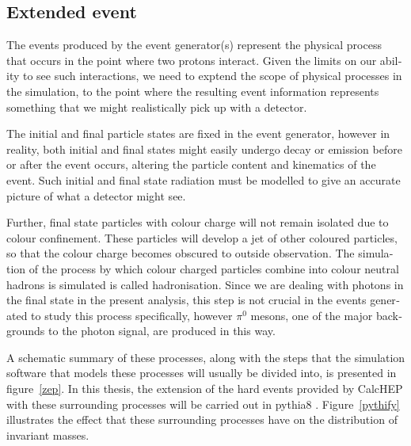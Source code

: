 \begin{english}
\section{Extended event}
The events produced by the event generator(s) represent the physical process that occurs in the point where two protons interact. Given the limits on our ability to see such interactions, we need to exptend the scope of physical processes in the simulation, to the point where the resulting event information represents something that we might realistically pick up with a detector.

The initial and final particle states are fixed in the event generator, however in reality, both initial and final states might easily undergo decay or emission before or after the event occurs, altering the particle content and kinematics of the event. Such initial and final state radiation must be modelled to give an accurate picture of what a detector might see.

Further, final state particles with colour charge will not remain isolated due to colour confinement. These particles will develop a jet of other coloured particles, so that the colour charge becomes obscured to outside observation. The simulation of the process by which colour charged particles combine into colour neutral hadrons is simulated is called hadronisation. Since we are dealing with photons in the final state in the present analysis, this step is not crucial in the events generated to study this process specifically, however $\pi^0$ mesons, one of the major backgrounds to the photon signal, are produced in this way. 

A schematic summary of these processes, along with the steps that the simulation software that models these processes will usually be divided into, is presented in figure~\ref{zep}. In this thesis, the extension of the hard events provided by CalcHEP with these surrounding processes will be carried out in pythia8 \cite{pythia}. Figure~\ref{pythify} illustrates the effect that these surrounding processes have on the distribution of invariant masses.


\end{english}
